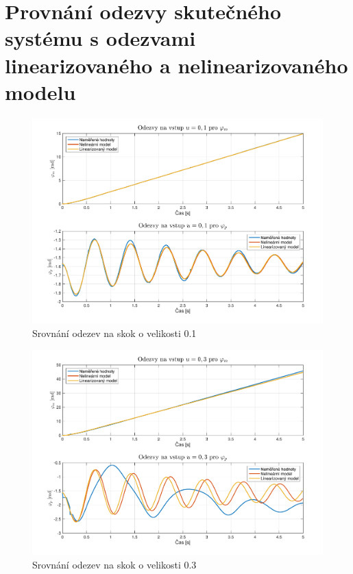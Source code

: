 \documentclass[11pt,a4paper]{article}
\begin{document}
\section{Provnání odezvy skutečného systému s odezvami linearizovaného a nelinearizovaného modelu}

\begin{figure}[H]
\centering
\includegraphics[scale=0.6]{Odezvy01.pdf}
\caption{Srovnání odezev na skok o velikosti 0.1}
\end{figure}

\begin{figure}[H]
\centering
\includegraphics[scale=0.6]{Odezvy03.pdf}
\caption{Srovnání odezev na skok o velikosti 0.3}
\end{figure}

\end{document}
